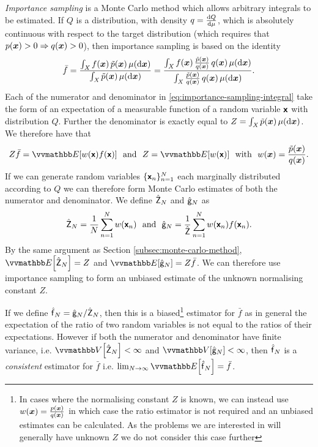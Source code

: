 \emph{Importance sampling} \citep{kahn1951estimation} is a Monte Carlo method which allows arbitrary integrals to be estimated. If $Q$ is a distribution, with density $q = \frac{\mathrm{d} Q}{\mathrm{d} \mu}$, which is absolutely continuous with respect to the target distribution (which requires that $p(\boldsymbol{x}) > 0 \Rightarrow q(\boldsymbol{x}) > 0$), then importance sampling is based on the identity
\begin{equation}\label{eq:importance-sampling-integral}
  \bar{f} =
  \frac
  {\int_{\mathit{X}} f(\boldsymbol{x}) \,\tilde{p}(\boldsymbol{x}) \,\mu(\mathrm{d}\boldsymbol{x})}
  {\int_{\mathit{X}} \tilde{p}(\boldsymbol{x}) \,\mu(\mathrm{d}\boldsymbol{x})}
  =
  \frac
  {\int_{\mathit{X}} f(\boldsymbol{x}) \,\frac{\tilde{p}(\boldsymbol{x})}{q(\boldsymbol{x})} \, q(\boldsymbol{x}) \,\mu(\mathrm{d}\boldsymbol{x})}
  {\int_{\mathit{X}} \frac{\tilde{p}(\boldsymbol{x})}{q(\boldsymbol{x})} \, q(\boldsymbol{x}) \,\mu(\mathrm{d}\boldsymbol{x})}.
\end{equation}
Each of the numerator and denominator in \eqref{eq:importance-sampling-integral} take the form of an expectation of a measurable function of a random variable $\boldsymbol{\mathsf{x}}$ with distribution $Q$. Further the denominator is exactly equal to $Z = \int_{\mathit{X}}\tilde{p}(\boldsymbol{x})\,\mu(\mathrm{d}\boldsymbol{x})$. We therefore have that
\begin{equation}\label{eq:importance-sampling-expectations}
  Z \bar{f} = \expc{w(\rvct{x}) f(\rvct{x})}
  ~~\textrm{and}~~
  Z = \expc{w(\rvct{x})}
  ~~\textrm{with}~~
  w(\vct{x}) = \frac{\utgtdens(\vct{x})}{q(\vct{x})}.
\end{equation}
If we can generate random variables $\lbrace \boldsymbol{\mathsf{x}}_n \rbrace_{n=1}^N$ each marginally distributed according to $Q$ we can therefore form Monte Carlo estimates of both the numerator and denominator. We define $\hat{\mathsf{Z}}_N$ and $\hat{\mathsf{g}}_N$ as
\begin{equation}\label{eq:importance-sampling-mc-estimates}
  \hat{\rvar{Z}}_N = \frac{1}{N} \sum_{n=1}^N w\lpa\rvct{x}_n\rpa
  ~~\textrm{and}~~
  \hat{\rvar{g}}_N = \frac{1}{\hat{\rvar{Z}}} \sum_{n=1}^N w\lpa\rvct{x}_n\rpa f\lpa\rvct{x}_n\rpa.
\end{equation}
By the same argument as Section \ref{subsec:monte-carlo-method}, $\expc{\hat{\rvar{Z}}_N} = Z$ and $\expc{\hat{\rvar{g}}_N} = Z\bar{f}$. We can therefore use importance sampling to form an unbiased estimate of the unknown normalising constant $Z$. 

If we define $\hatf_N = \hat{\rvar{g}}_N / \hat{\rvar{Z}}_N$, then this is a biased\footnote{In cases where the normalising constant $Z$ is known, we can instead use $w(\boldsymbol{x}) = \frac{p(\boldsymbol{x})}{q(\boldsymbol{x})}$ in which case the ratio estimator is not required and an unbiased estimates can be calculated. As the problems we are interested in will generally have unknown $Z$ we do not consider this case further} estimator for $\bar{f}$ as in general the expectation of the ratio of two random variables is not equal to the ratios of their expectations. However if both the numerator and denominator have finite variance, i.e. $\var{\hat{\rvar{Z}}_N} < \infty$ and $\var{\hat{\rvar{g}}_N} < \infty$, then $\hatf_N$ is a \emph{consistent} estimator for $\bar{f}$ i.e. $\lim_{N\to\infty} \expc{\hatf_N} = \bar{f}$.

